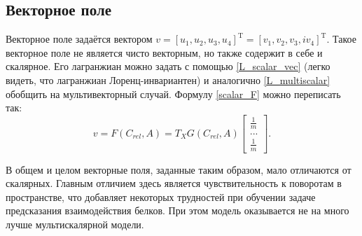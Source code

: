 \subsection{Векторное поле}
Векторное поле задаётся вектором $v = [u_1, u_2, u_3, u_4]^\mathrm{T} = [v_1, v_2, v_3, iv_4]^\mathrm{T}$. Такое векторное поле не является чисто векторным, но также содержит в себе и скалярное.
Его лагранжиан можно задать с помощью \ref{L_scalar_vec} (легко видеть, что лагранжиан Лоренц-инвариантен) и аналогично \ref{L_multiscalar} обобщить на мультивекторный случай.
Формулу \ref{scalar_F} можно переписать так:
\begin{equation}
	v = F(C_{rel}, A) = T_{X}G(C_{rel}, A)\begin{bmatrix} \frac{1}{m} \\ ... \\ \frac{1}{m} \end{bmatrix}.
	\label{scalar_F}
\end{equation}

В общем и целом векторные поля, заданные таким образом, мало отличаются от скалярных. Главным отличием здесь является чувствительность к поворотам в пространстве,
что добавляет некоторых трудностей при обучении задаче предсказания взаимодействия белков. При этом модель оказывается не на много лучше мультискалярной модели.






